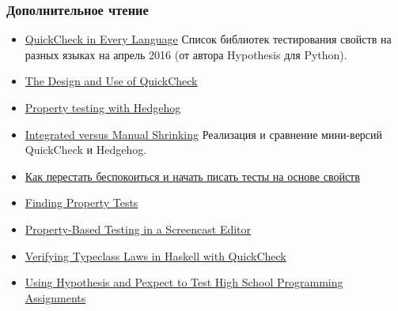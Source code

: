 \documentclass[11pt]{beamer}
\begin{document}
\begin{frame}[fragile]
  \frametitle{Дополнительное чтение}
  \begin{itemize}
    \item \href{https://hypothesis.works/articles/quickcheck-in-every-language/}{QuickCheck in Every Language} Список библиотек тестирования свойств на разных языках на апрель 2016 (от автора Hypothesis для Python).
    \item \href{https://begriffs.com/posts/2017-01-14-design-use-quickcheck.html}{The Design and Use of QuickCheck}
    \item \href{https://teh.id.au/posts/2017/04/23/property-testing-with-hedgehog/}{Property testing with Hedgehog}
    \item \href{http://www.well-typed.com/blog/2019/05/integrated-shrinking/}{Integrated versus Manual Shrinking} Реализация и сравнение мини-версий QuickCheck и Hedgehog.
    \item \href{https://habr.com/ru/post/434008/}{Как перестать беспокоиться и начать писать тесты на основе свойств}
    \item \href{https://www.hillelwayne.com/post/contract-examples/}{Finding Property Tests}
    \item \href{https://wickstrom.tech/programming/2019/03/02/property-based-testing-in-a-screencast-editor-introduction.html}{Property-Based Testing in a Screencast Editor}
    \item \href{https://austinrochford.com/posts/2014-05-27-quickcheck-laws.html}{Verifying Typeclass Laws in Haskell with QuickCheck}
    \item \href{https://blog.jrheard.com/hypothesis-and-pexpect}{Using Hypothesis and Pexpect to Test High School Programming Assignments}
  \end{itemize}
\end{frame}
\end{document}

